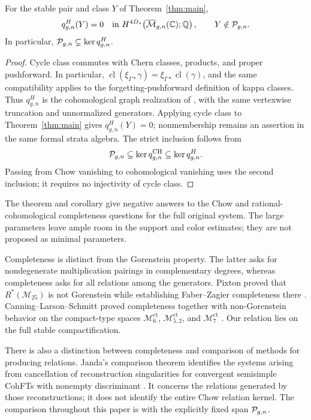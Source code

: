 \begin{corollary}
\label{cor:cohomological-incompleteness}
For the stable pair and class \(Y\) of Theorem~\ref{thm:main},
\[
q^H_{g,n}(Y)=0
\quad\text{in }H^{4D_*}\!\left(\overline{\mathcal M}_{g,n}(\mathbb C);\mathbb Q\right),
\qquad
Y\notin\mathcal P_{g,n}.
\]
In particular, \(\mathcal P_{g,n}\subsetneq\ker q^H_{g,n}\).
\end{corollary}

\begin{proof}
Cycle class commutes with Chern classes, products, and proper
pushforward. In particular,
\(\operatorname{cl}(\xi_{\Gamma*}\gamma)
=\xi_{\Gamma*}\operatorname{cl}(\gamma)\), and the same compatibility
applies to the forgetting-pushforward definition of kappa classes.
Thus \(q^H_{g,n}\) is the cohomological graph realization of
\cite[Section~0.3]{PPZ}, with the same vertexwise truncation and
unnormalized generators. Applying cycle class to
Theorem~\ref{thm:main} gives \(q^H_{g,n}(Y)=0\); nonmembership remains
an assertion in the same formal strata algebra. The strict inclusion
follows from
\[
\mathcal P_{g,n}\subseteq\ker q^{\mathrm{CH}}_{g,n}
\subseteq\ker q^H_{g,n}.
\]
Passing from Chow vanishing to cohomological vanishing uses the second
inclusion; it requires no injectivity of cycle class.
\end{proof}

The theorem and corollary give negative answers to the Chow and
rational-cohomological completeness questions for the full original
system. The large parameters leave ample room in the support and color
estimates; they are not proposed as minimal parameters.

Completeness is distinct from the Gorenstein property. The latter asks
for nondegenerate multiplication pairings in complementary degrees,
whereas completeness asks for all relations among the generators.
Pixton proved that \(R^*(\mathcal M_{25})\) is not Gorenstein while
establishing Faber--Zagier completeness there
\cite[Theorem~1.1 and Section~2.2]{Pixton2026}.
Canning--Larson--Schmitt proved completeness together with
non-Gorenstein behavior on the compact-type spaces
\(\mathcal M^{\mathrm{ct}}_6\), \(\mathcal M^{\mathrm{ct}}_{5,2}\), and
\(\mathcal M^{\mathrm{ct}}_7\)
\cite[Theorems~1 and~7]{CanningLarsonSchmitt2026}.
Our relation lies on the full stable compactification.

There is also a distinction between completeness and comparison of
methods for producing relations. Janda's comparison theorem identifies
the systems arising from cancellation of reconstruction singularities
for convergent semisimple CohFTs with nonempty discriminant
\cite[Definition~3.3.1 and Theorem~3.3.6]{JandaDiscriminant}.
It concerns the relations generated by those reconstructions; it does
not identify the entire Chow relation kernel. The comparison throughout
this paper is with the explicitly fixed span \(\mathcal P_{g,n}\).

